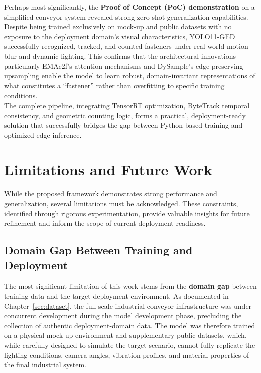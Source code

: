 Perhaps most significantly, the \textbf{Proof of Concept (PoC) demonstration} on a simplified conveyor system revealed strong zero-shot generalization capabilities. Despite being trained exclusively on mock-up and public datasets with no exposure to the deployment domain's visual characteristics, YOLO11-GED successfully recognized, tracked, and counted fasteners under real-world motion blur and dynamic lighting. This confirms that the architectural innovations particularly EMAc2f's attention mechanisms and DySample's edge-preserving upsampling enable the model to learn robust, domain-invariant representations of what constitutes a ``fastener'' rather than overfitting to specific training conditions.\\

The complete pipeline, integrating TensorRT optimization, ByteTrack temporal consistency, and geometric counting logic, forms a practical, deployment-ready solution that successfully bridges the gap between Python-based training and optimized edge inference.

\section{Limitations and Future Work}

While the proposed framework demonstrates strong performance and generalization, several limitations must be acknowledged. These constraints, identified through rigorous experimentation, provide valuable insights for future refinement and inform the scope of current deployment readiness.

\subsection{Domain Gap Between Training and Deployment}

The most significant limitation of this work stems from the \textbf{domain gap} between training data and the target deployment environment. As documented in Chapter~\ref{sec:dataset}, the full-scale industrial conveyor infrastructure was under concurrent development during the model development phase, precluding the collection of authentic deployment-domain data. The model was therefore trained on a physical mock-up environment and supplementary public datasets, which, while carefully designed to simulate the target scenario, cannot fully replicate the lighting conditions, camera angles, vibration profiles, and material properties of the final industrial system.\\

